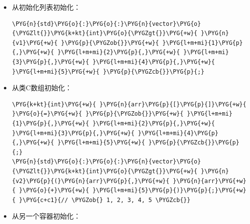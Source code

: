 \begin{itemize}
\item 从初始化列表初始化：



\begin{codeblockbg}
\begin{Verbatim}[commandchars=\\\{\},breaklines=true,breakanywhere=true,fontsize=\codefont,xleftmargin=17bp]
\PYG{n}{std}\PYG{o}{:}\PYG{o}{:}\PYG{n}{vector}\PYG{o}{\PYGZlt{}}\PYG{k+kt}{int}\PYG{o}{\PYGZgt{}}\PYG{+w}{ }\PYG{n}{v1}\PYG{+w}{ }\PYG{p}{\PYGZob{}}\PYG{+w}{ }\PYG{l+m+mi}{1}\PYG{p}{,}\PYG{+w}{ }\PYG{l+m+mi}{2}\PYG{p}{,}\PYG{+w}{ }\PYG{l+m+mi}{3}\PYG{p}{,}\PYG{+w}{ }\PYG{l+m+mi}{4}\PYG{p}{,}\PYG{+w}{ }\PYG{l+m+mi}{5}\PYG{+w}{ }\PYG{p}{\PYGZcb{}}\PYG{p}{;}
\end{Verbatim}
\end{codeblockbg}



\item 从类C数组初始化：



\begin{codeblockbg}
\begin{Verbatim}[commandchars=\\\{\},breaklines=true,breakanywhere=true,fontsize=\codefont,xleftmargin=17bp]
\PYG{k+kt}{int}\PYG{+w}{ }\PYG{n}{arr}\PYG{p}{[}\PYG{p}{]}\PYG{+w}{ }\PYG{o}{=}\PYG{+w}{ }\PYG{p}{\PYGZob{}}\PYG{+w}{ }\PYG{l+m+mi}{1}\PYG{p}{,}\PYG{+w}{ }\PYG{l+m+mi}{2}\PYG{p}{,}\PYG{+w}{ }\PYG{l+m+mi}{3}\PYG{p}{,}\PYG{+w}{ }\PYG{l+m+mi}{4}\PYG{p}{,}\PYG{+w}{ }\PYG{l+m+mi}{5}\PYG{+w}{ }\PYG{p}{\PYGZcb{}}\PYG{p}{;}
\PYG{n}{std}\PYG{o}{:}\PYG{o}{:}\PYG{n}{vector}\PYG{o}{\PYGZlt{}}\PYG{k+kt}{int}\PYG{o}{\PYGZgt{}}\PYG{+w}{ }\PYG{n}{v2}\PYG{p}{(}\PYG{n}{arr}\PYG{p}{,}\PYG{+w}{ }\PYG{n}{arr}\PYG{+w}{ }\PYG{o}{+}\PYG{+w}{ }\PYG{l+m+mi}{5}\PYG{p}{)}\PYG{p}{;}\PYG{+w}{ }\PYG{c+c1}{// \PYGZob{} 1, 2, 3, 4, 5 \PYGZcb{}}
\end{Verbatim}
\end{codeblockbg}



\item 从另一个容器初始化：




\end{itemize}
